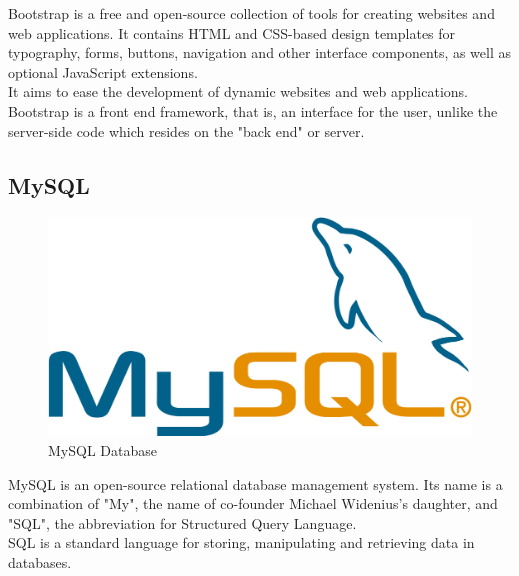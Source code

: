 Bootstrap is a free and open-source collection of tools for creating websites and web applications. It contains HTML and CSS-based design templates for typography, forms, buttons, navigation and other interface components, as well as optional JavaScript extensions. \\
It aims to ease the development of dynamic websites and web applications.\\
Bootstrap is a front end framework, that is, an interface for the user, unlike the server-side code which resides on the "back end" or server.

\subsection{MySQL} 
\begin{figure}[h!]
\centering \includegraphics[scale=0.2]{input/images/sql.png}
\caption{MySQL Database}
\end{figure}
MySQL is an open-source relational database management system. Its name is a combination of "My", the name of co-founder Michael Widenius's daughter, and "SQL", the abbreviation for Structured Query Language.\\
SQL is a standard language for storing, manipulating and retrieving data in databases.

